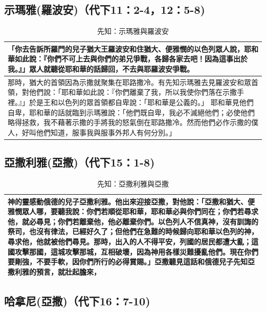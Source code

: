 \subsection{示瑪雅(羅波安)（代下11：2-4，12：5-8)}
\begin{table}[!hbp]
\centering
\begin{tabular}{p{16cm}}
\hline
\hline
「你去告訴所羅門的兒子猶大王羅波安和住猶大、便雅憫的以色列眾人說，耶和華如此說：『你們不可上去與你們的弟兄爭戰，各歸各家去吧！因為這事出於我。』」眾人就聽從耶和華的話歸回，不去與耶羅波安爭戰。 \\\hline
那時，猶大的首領因為示撒就聚集在耶路撒冷。有先知示瑪雅去見羅波安和眾首領，對他們說：「耶和華如此說：『你們離棄了我，所以我使你們落在示撒手裡。』」於是王和以色列的眾首領都自卑說：「耶和華是公義的。」 耶和華見他們自卑，耶和華的話就臨到示瑪雅說：「他們既自卑，我必不滅絕他們；必使他們略得拯救，我不藉著示撒的手將我的怒氣倒在耶路撒冷。然而他們必作示撒的僕人，好叫他們知道，服事我與服事外邦人有何分別。」\\\hline
\end{tabular}
\caption{先知：示瑪雅與羅波安}
\end{table}



\subsection{亞撒利雅(亞撒)（代下15：1-8)}
\begin{table}[!hbp]
\centering
\begin{tabular}{p{16cm}}
\hline
\hline
神的靈感動俄德的兒子亞撒利雅。他出來迎接亞撒，對他說：「亞撒和猶大、便雅憫眾人哪，要聽我說：你們若順從耶和華，耶和華必與你們同在；你們若尋求他，就必尋見；你們若離棄他，他必離棄你們。以色列人不信真神，沒有訓誨的祭司，也沒有律法，已經好久了；但他們在急難的時候歸向耶和華以色列的神，尋求他，他就被他們尋見。那時，出入的人不得平安，列國的居民都遭大亂；這國攻擊那國，這城攻擊那城，互相破壞，因為神用各樣災難擾亂他們。現在你們要剛強，不要手軟，因你們所行的必得賞賜。」亞撒聽見這話和俄德兒子先知亞撒利雅的預言，就壯起膽來，\\\hline 
\end{tabular}
\caption{先知：亞撒利雅與亞撒}
\end{table}


\subsection{哈拿尼(亞撒)（代下16：7-10)}
